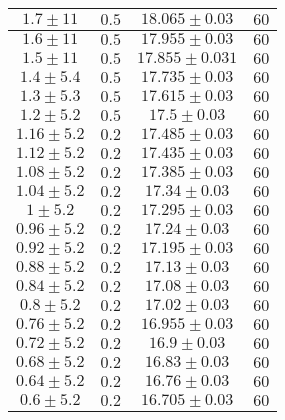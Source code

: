 \documentclass[../main.tex]{subfiles}
\begin{document}
\begin{tabular}{ ||c|c|c|c|| }
        \hline
        $1.7\pm 11$       & $0.5$       & $18.065\pm 0.03$  & $60$     \\
        \hline
        $1.6\pm 11$       & $0.5$       & $17.955\pm 0.03$  & $60$     \\
        \hline
        $1.5\pm 11$       & $0.5$       & $17.855\pm 0.031$ & $60$     \\
        \hline
        $1.4\pm 5.4$      & $0.5$       & $17.735\pm 0.03$  & $60$     \\
        \hline
        $1.3\pm 5.3$      & $0.5$       & $17.615\pm 0.03$  & $60$     \\
        \hline
        $1.2\pm 5.2$      & $0.5$       & $17.5\pm 0.03$    & $60$     \\
        \hline
        $1.16\pm 5.2$     & $0.2$       & $17.485\pm 0.03$  & $60$     \\
        \hline
        $1.12\pm 5.2$     & $0.2$       & $17.435\pm 0.03$  & $60$     \\
        \hline
        $1.08\pm 5.2$     & $0.2$       & $17.385\pm 0.03$  & $60$     \\
        \hline
        $1.04\pm 5.2$     & $0.2$       & $17.34\pm 0.03$   & $60$     \\
        \hline
        $1\pm 5.2$        & $0.2$       & $17.295\pm 0.03$  & $60$     \\
        \hline
        $0.96\pm 5.2$     & $0.2$       & $17.24\pm 0.03$   & $60$     \\
        \hline
        $0.92\pm 5.2$     & $0.2$       & $17.195\pm 0.03$  & $60$     \\
        \hline
        $0.88\pm 5.2$     & $0.2$       & $17.13\pm 0.03$   & $60$     \\
        \hline
        $0.84\pm 5.2$     & $0.2$       & $17.08\pm 0.03$   & $60$     \\
        \hline
        $0.8\pm 5.2$      & $0.2$       & $17.02\pm 0.03$   & $60$     \\
        \hline
        $0.76\pm 5.2$     & $0.2$       & $16.955\pm 0.03$  & $60$     \\
        \hline
        $0.72\pm 5.2$     & $0.2$       & $16.9\pm 0.03$    & $60$     \\
        \hline
        $0.68\pm 5.2$     & $0.2$       & $16.83\pm 0.03$   & $60$     \\
        \hline
        $0.64\pm 5.2$     & $0.2$       & $16.76\pm 0.03$   & $60$     \\
        \hline
        $0.6\pm 5.2$      & $0.2$       & $16.705\pm 0.03$  & $60$     \\

\end{tabular}
\end{document}
